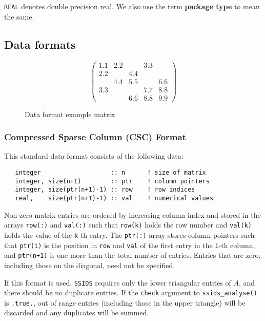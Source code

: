 \documentclass{spral}
\begin{document}
\noindent
{\tt REAL} denotes double precision real.
We also use the term {\bf package type} to mean the same.

\subsection{Data formats} \label{dataformats}

\begin{figure}
   \caption{ \label{format eg}
      Data format example matrix
   }
   $$
      \left( \begin{array}{ccccc}
         1.1 & 2.2 &     & 3.3 &     \\
         2.2 &     & 4.4 &     &     \\
             & 4.4 & 5.5 &     & 6.6 \\
         3.3 &     &     & 7.7 & 8.8 \\
             &     & 6.6 & 8.8 & 9.9
      \end{array} \right)
   $$
\end{figure}

\subsubsection{Compressed Sparse Column (CSC) Format} \label{cscformat}
This standard data format consists of the following data:
\begin{verbatim}
   integer                   :: n      ! size of matrix
   integer, size(n+1)        :: ptr    ! column pointers
   integer, size(ptr(n+1)-1) :: row    ! row indices
   real,    size(ptr(n+1)-1) :: val    ! numerical values
\end{verbatim}
Non-zero matrix entries are ordered by increasing column index and stored in
the arrays \texttt{row(:)} and \texttt{val(:)} such that \texttt{row(k)} holds
the row number and \texttt{val(k)} holds the value of the \texttt{k}-th entry.
The \texttt{ptr(:)} array stores column pointers such that \texttt{ptr(i)} is
the position in \texttt{row} and \texttt{val} of
the first entry in the \texttt{i}-th column, and \texttt{ptr(n+1)} is one more
than the total number of entries.
Entries that are zero, including those on the diagonal, need not be specified.

If this format is used, \texttt{SSIDS} requires only the lower triangular entries of $A$, and there 
should be no duplicate entries. If the \texttt{check}
argument to
\texttt{ssids\_analyse()} is \texttt{.true.}, out of range entries (including
those in the upper triangle) will be discarded and any duplicates will be
summed.
\end{document}
